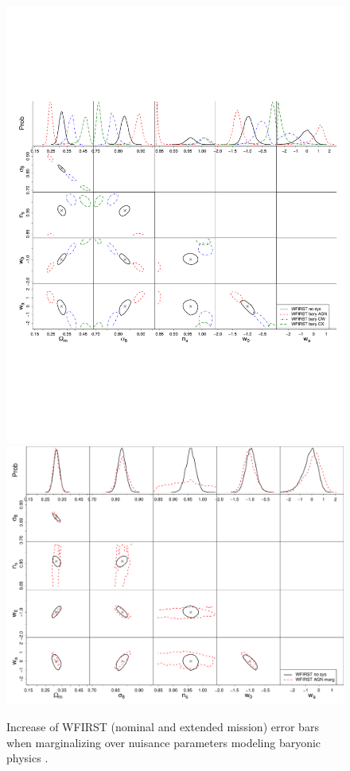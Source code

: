 \begin{figure}
\includegraphics[width=14cm]{Plots/forecasts/WFIRST_bary_impact.pdf}
\includegraphics[width=14cm]{Plots/forecasts/WFIRST_bary_miti.pdf}
\caption{Increase of WFIRST (nominal and extended mission) error bars when marginalizing over nuisance parameters modeling baryonic physics \citep[see][for details of the method]{Eifler2015}.}
         \label{fi:bary}
\end{figure}

